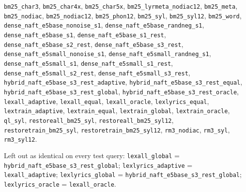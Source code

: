 {\footnotesize\raggedright \texttt{bm25\_char3}, \texttt{bm25\_char4x}, \texttt{bm25\_char5x}, \texttt{bm25\_lyrmeta\_nodiac12}, \texttt{bm25\_meta}, \texttt{bm25\_nodiac}, \texttt{bm25\_nodiac12}, \texttt{bm25\_phon12}, \texttt{bm25\_syl}, \texttt{bm25\_syl12}, \texttt{bm25\_word}, \texttt{dense\_naft\_e5base\_nonoise\_s1}, \texttt{dense\_naft\_e5base\_randneg\_s1}, \texttt{dense\_naft\_e5base\_s1}, \texttt{dense\_naft\_e5base\_s1\_rest}, \texttt{dense\_naft\_e5base\_s2\_rest}, \texttt{dense\_naft\_e5base\_s3\_rest}, \texttt{dense\_naft\_e5small\_nonoise\_s1}, \texttt{dense\_naft\_e5small\_randneg\_s1}, \texttt{dense\_naft\_e5small\_s1}, \texttt{dense\_naft\_e5small\_s1\_rest}, \texttt{dense\_naft\_e5small\_s2\_rest}, \texttt{dense\_naft\_e5small\_s3\_rest}, \texttt{hybrid\_naft\_e5base\_s3\_rest\_adaptive}, \texttt{hybrid\_naft\_e5base\_s3\_rest\_equal}, \texttt{hybrid\_naft\_e5base\_s3\_rest\_global}, \texttt{hybrid\_naft\_e5base\_s3\_rest\_oracle}, \texttt{lexall\_adaptive}, \texttt{lexall\_equal}, \texttt{lexall\_oracle}, \texttt{lexlyrics\_equal}, \texttt{lextrain\_adaptive}, \texttt{lextrain\_equal}, \texttt{lextrain\_global}, \texttt{lextrain\_oracle}, \texttt{ql\_syl}, \texttt{restoreall\_bm25\_syl}, \texttt{restoreall\_bm25\_syl12}, \texttt{restoretrain\_bm25\_syl}, \texttt{restoretrain\_bm25\_syl12}, \texttt{rm3\_nodiac}, \texttt{rm3\_syl}, \texttt{rm3\_syl12}.\par}

\noindent Left out as identical on every test query: {\footnotesize \texttt{lexall\_global} = \texttt{hybrid\_naft\_e5base\_s3\_rest\_global}; \texttt{lexlyrics\_adaptive} = \texttt{lexall\_adaptive}; \texttt{lexlyrics\_global} = \texttt{hybrid\_naft\_e5base\_s3\_rest\_global}; \texttt{lexlyrics\_oracle} = \texttt{lexall\_oracle}.}
